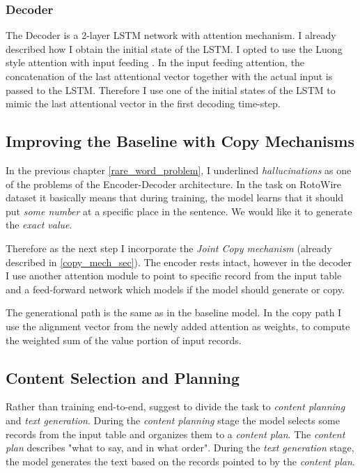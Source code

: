 \subsubsection{Decoder}

The Decoder is a 2-layer LSTM network with attention mechanism. I already described how I obtain the initial state of the LSTM. I opted to use the Luong style attention with input feeding \citep{luong2015effective}. In the input feeding attention, the concatenation of the last attentional vector together with the actual input is passed to the LSTM. Therefore I use one of the initial states of the LSTM to mimic the last attentional vector in the first decoding time-step.

\subsection{Improving the Baseline with Copy Mechanisms}

In the previous chapter \ref{rare_word_problem}, I underlined \emph{hallucinations} as one of the problems of the Encoder-Decoder architecture. In the task on RotoWire dataset it basically means that during training, the model learns that it should put \emph{some number} at a specific place in the sentence. We would like it to generate the \emph{exact value}.

Therefore as the next step I incorporate the \emph{Joint Copy mechanism} \citep{gu2016incorporating} (already described in \ref{copy_mech_sec}). The encoder rests intact, however in the decoder I use another attention module to point to specific record from the input table and a feed-forward network which models if the model should generate or copy.

The generational path is the same as in the baseline model. In the copy path I use the alignment vector from the newly added attention as weights, to compute the weighted sum of the value portion of input records.

\subsection{Content Selection and Planning}

Rather than training end-to-end, \citep{puduppully2019datatotext} suggest to divide the task to \emph{content planning} and \emph{text generation}. During the \emph{content planning} stage the model selects some records from the input table and organizes them to a \emph{content plan}. The \emph{content plan} describes "what to say, and in what order". During the \emph{text generation} stage, the model generates the text based on the records pointed to by the \emph{content plan}.

